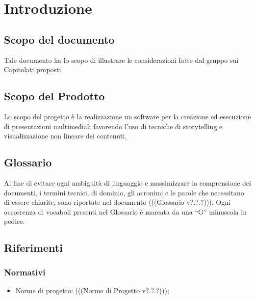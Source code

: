 \section{Introduzione}
\subsection{Scopo del documento}
Tale documento ha lo scopo di illustrare le considerazioni fatte dal gruppo sui Capitolati proposti. 
\subsection{Scopo del Prodotto}
Lo scopo del progetto è la realizzazione un software per la creazione ed esecuzione di presentazioni multimediali favorendo l’uso di tecniche di storytelling e visualizzazione non lineare dei contenuti.
\subsection{Glossario}
Al fine di evitare ogni ambiguità di linguaggio e massimizzare la comprensione dei documenti, i termini tecnici, di dominio, gli acronimi e le parole che necessitano di essere chiarite, sono riportate nel documento (((Glossario v?.?.?))). Ogni occorrenza di vocaboli presenti nel Glossario è marcata da una “G” minuscola in pedice.
\subsection{Riferimenti}

\subsubsection{Normativi}
\begin{itemize}
\item Norme di progetto: (((Norme di Progetto v?.?.?)));
\end{itemize}
